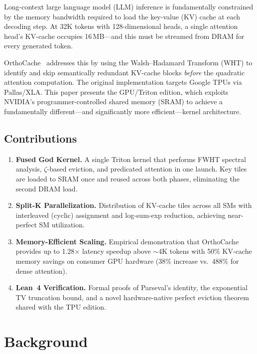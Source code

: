 \documentclass[conference]{IEEEtran}
\begin{document}
Long-context large language model (LLM) inference is fundamentally
constrained by the memory bandwidth required to load the key-value
(KV) cache at each decoding step. At 32K tokens with 128-dimensional
heads, a single attention head's KV-cache occupies 16\,MB---and this
must be streamed from DRAM for every generated token.

OrthoCache~\cite{orthocache_tpu} addresses this by using the Walsh--Hadamard
Transform (WHT) to identify and skip semantically redundant KV-cache
blocks \textit{before} the quadratic attention computation. The original
implementation targets Google TPUs via Pallas/XLA. This paper presents
the GPU/Triton edition, which exploits NVIDIA's programmer-controlled
shared memory (SRAM) to achieve a fundamentally different---and
significantly more efficient---kernel architecture.

\subsection{Contributions}

\begin{enumerate}
\item \textbf{Fused God Kernel.} A single Triton kernel that performs
FWHT spectral analysis, $\zeta$-based eviction, and predicated
attention in one launch. Key tiles are loaded to SRAM once and reused
across both phases, eliminating the second DRAM load.

\item \textbf{Split-K Parallelization.} Distribution of KV-cache tiles
across all SMs with interleaved (cyclic) assignment and log-sum-exp
reduction, achieving near-perfect SM utilization.

\item \textbf{Memory-Efficient Scaling.} Empirical demonstration that
OrthoCache provides up to 1.28$\times$ latency speedup above $\sim$4K tokens
with 50\% KV-cache memory savings on consumer GPU hardware (38\% increase vs.\ 488\% for dense attention).

\item \textbf{Lean~4 Verification.} Formal proofs of Parseval's
identity, the exponential TV truncation bound, and a novel
hardware-native perfect eviction theorem shared with the TPU edition.
\end{enumerate}


\section{Background}\label{sec:background}
\end{document}
